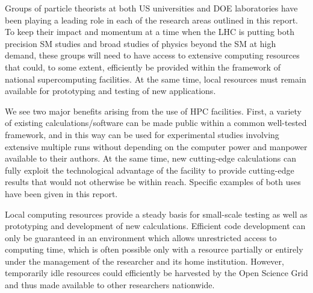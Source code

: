 Groups of particle theorists at both US universities and DOE
laboratories have been playing a leading role in each of the research
areas outlined in this report. To keep their impact and momentum at a time 
when the LHC is putting both precision SM studies and broad studies
of physics beyond the SM at high demand, these groups will need to have
access to extensive computing resources that could, to some extent, efficiently 
be provided within the framework of national supercomputing facilities.
At the same time, local resources must remain available for prototyping 
and testing of new applications.

We see two major benefits arising from the use of HPC facilities.  
First, a variety of existing
calculations/software can be made public within a common well-tested
framework, and in this way can be used for experimental studies
involving extensive multiple runs without depending on the computer
power and manpower available to their authors.  At the same time, new
cutting-edge calculations can fully exploit the technological advantage
of the facility to provide cutting-edge results that would not otherwise 
be within reach. Specific examples of both uses have been given in this report.

Local computing resources provide a steady basis for small-scale
testing as well as prototyping and development of new calculations.
Efficient code development can only be guaranteed in an environment 
which allows unrestricted access to computing time, which is often
possible only with a resource partially or entirely under the management
of the researcher and its home institution. However, temporarily idle 
resources could efficiently be harvested by the Open Science Grid 
and thus made available to other researchers nationwide.

\clearpage

  




